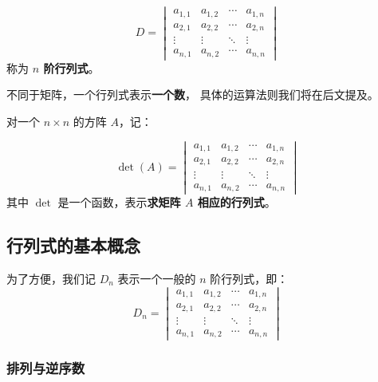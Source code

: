 \documentclass[UTF8]{article}
\begin{document}
	\begin{equation*}
		D = 
		\begin{vmatrix}
			a_{1, 1} & a_{1, 2} & \cdots & a_{1, n}
			\\
			a_{2, 1} & a_{2, 2} & \cdots & a_{2, n}
			\\
			\vdots & \vdots & \ddots & \vdots
			\\
			a_{n, 1} & a_{n, 2} & \cdots & a_{n, n}
		\end{vmatrix}
	\end{equation*}
	称为 \textbf{$n$ 阶行列式}。

	不同于矩阵，一个行列式表示\textbf{一个数}，
	具体的运算法则我们将在后文提及。

	\bigskip

	对一个 $n \times n$ 的方阵 $A$，记：

	\begin{equation*}
		\det(A) = 
		\begin{vmatrix}
			a_{1, 1} & a_{1, 2} & \cdots & a_{1, n}
			\\
			a_{2, 1} & a_{2, 2} & \cdots & a_{2, n}
			\\
			\vdots & \vdots & \ddots & \vdots
			\\
			a_{n, 1} & a_{n, 2} & \cdots & a_{n, n}
		\end{vmatrix}
	\end{equation*}
	其中 $\det$ 是一个函数，表示{\bfseries 求矩阵 $A$ 相应的行列式}。

	\subsection{行列式的基本概念}

	为了方便，我们记 $D_n$ 表示一个一般的 $n$ 阶行列式，即：
	\begin{equation*}
		D_n = 
		\begin{vmatrix}
			a_{1, 1} & a_{1, 2} & \cdots & a_{1, n}
			\\
			a_{2, 1} & a_{2, 2} & \cdots & a_{2, n}
			\\
			\vdots & \vdots & \ddots & \vdots
			\\
			a_{n, 1} & a_{n, 2} & \cdots & a_{n, n}
		\end{vmatrix}
	\end{equation*}

	\subsubsection{排列与逆序数}
\end{document}
